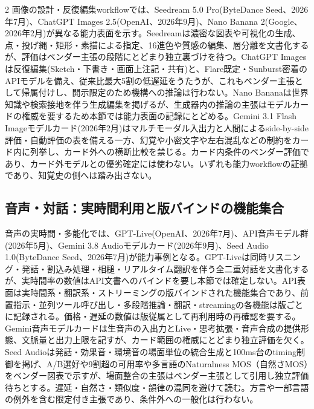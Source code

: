 \documentclass[lualatex,a4paper,10pt]{jlreq}
\begin{document}
\begin{multicols}{2}
画像の設計・反復編集workflowでは、Seedream 5.0 Pro(ByteDance Seed、2026年7月)、ChatGPT Images 2.5(OpenAI、2026年9月)、Nano Banana 2(Google、2026年2月)が異なる能力表面を示す\autocite{btd102}\autocite{btd103}\autocite{btd104}。Seedreamは濃密な図表や可視化の生成、点・投げ縄・矩形・素描による指定、16進色や質感の編集、層分離を文書化するが、評価はベンダー主張の段階にとどまり独立裏づけを待つ。ChatGPT Imagesは反復編集(Sketch・下書き・画面上注記・共有)と、Flare既定・Sunburst密着のAPIモデルを備え、従来比最大5割の低遅延をうたうが、これもベンダー主張として帰属付けし、開示限定のため機構への推論は行わない。Nano Bananaは世界知識や検索接地を伴う生成編集を掲げるが、生成器内の推論の主張はモデルカードの権威を要するため本節では能力表面の記録にとどめる。Gemini 3.1 Flash Imageモデルカード(2026年2月)はマルチモーダル入出力と人間によるside-by-side評価・自動評価の表を備える一方、幻覚や小密文字や左右混乱などの制約をカード内に列挙し、カード外への横断比較を禁じる\autocite{btd105}。カード内条件のベンダー評価であり、カード外モデルとの優劣確定には使わない。いずれも能力workflowの証拠であり、知覚史の側へは踏み出さない。

\subsection{音声・対話：実時間利用と版バインドの機能集合}
音声の実時間・多能化では、GPT-Live(OpenAI、2026年7月)、API音声モデル群(2026年5月)、Gemini 3.8 Audioモデルカード(2026年9月)、Seed Audio 1.0(ByteDance Seed、2026年7月)が能力事例となる\autocite{btd107}\autocite{btd108}\autocite{btd109}\autocite{btd110}。GPT-Liveは同時リスニング・発話・割込み処理・相槌・リアルタイム翻訳を伴う全二重対話を文書化するが、実時間率の数値はAPI文書へのバインドを要し本節では確定しない。API表面は実時間系・翻訳系・ストリーミングの版バインドされた機能集合であり、前置指示・並列ツール呼び出し・多段階推論・翻訳・streamingの各機能は版ごとに記録される。価格・遅延の数値は版従属として再利用時の再確認を要する。Gemini音声モデルカードは生音声の入出力とLive・思考拡張・音声合成の提供形態、文脈量と出力上限を記すが、カード範囲の権威にとどまり独立評価を欠く。Seed Audioは発話・効果音・環境音の場面単位の統合生成と100ms台のtiming制御を掲げ、A/B選好や9割超の可用率や多言語のNaturalness MOS（自然さMOS）をベンダー図表で示すが、場面整合の主張はベンダー主張として引用し独立評価待ちとする。遅延・自然さ・類似度・韻律の混同を避けて読む。方言や一部言語の例外を含む限定付き主張であり、条件外への一般化は行わない。


\end{multicols}
\end{document}

